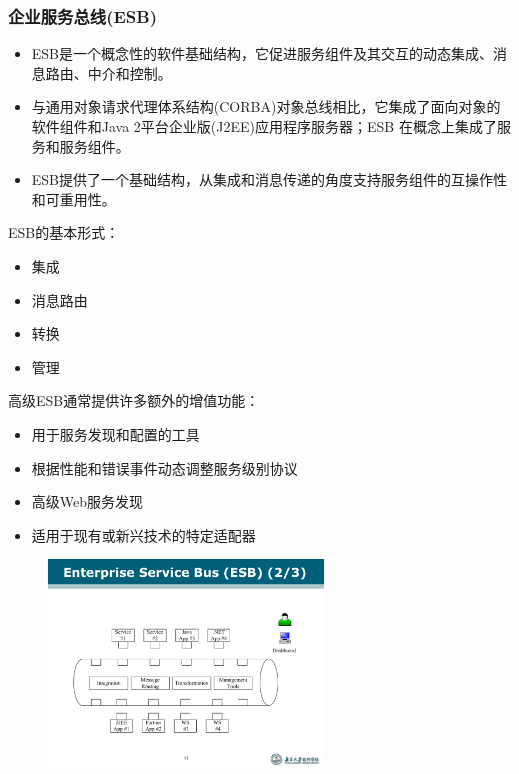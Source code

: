 \vspace{-0.5em}
\begin{shaded}
\subsubsection*{企业服务总线(ESB)}
\begin{itemize}
    \item ESB是一个概念性的软件基础结构，它促进服务组件及其交互的动态集成、消息路由、中介和控制。
    \item 与通用对象请求代理体系结构(CORBA)对象总线相比，它集成了面向对象的软件组件和Java 2平台企业版(J2EE)应用程序服务器；ESB 在概念上集成了服务和服务组件。
    \item ESB提供了一个基础结构，从集成和消息传递的角度支持服务组件的互操作性和可重用性。
\end{itemize}

ESB的基本形式：
\vspace{-0.8em}
\begin{multicols}{4}
    \begin{itemize}
        \item 集成
        \item 消息路由
        \item 转换
        \item 管理
    \end{itemize}
\end{multicols}
\vspace{-1em}

高级ESB通常提供许多额外的增值功能：
\vspace{-0.8em}
\begin{multicols}{2}
    \begin{itemize}
        \item 用于服务发现和配置的工具
        \item 根据性能和错误事件动态调整服务级别协议
        \item 高级Web服务发现
        \item 适用于现有或新兴技术的特定适配器
    \end{itemize}
\end{multicols}
\vspace{-1em}

\begin{figure}[H]
    \vspace{-0.5em}
	\centering
	\includegraphics[width=0.65\textwidth]{images/ESB.pdf}
    \vspace{-1em}
\end{figure}

\end{shaded}
